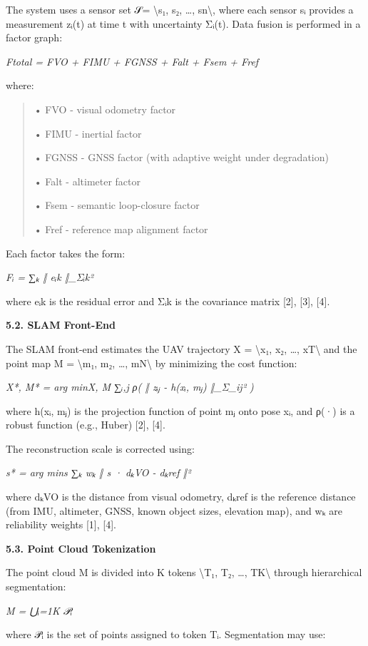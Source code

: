 \documentclass[
]{article}
\begin{document}
The system uses a sensor set 𝒮= \textbackslash s₁, s₂, \ldots,
sn\textbackslash, where each sensor sᵢ provides a measurement zᵢ(t) at
time t with uncertainty Σᵢ(t). Data fusion is performed in a factor
graph:

\emph{Ftotal = FVO + FIMU + FGNSS + Falt + Fsem + Fref}

where:

\begin{quote}
• FVO - visual odometry factor

• FIMU - inertial factor

• FGNSS - GNSS factor (with adaptive weight under degradation)

• Falt - altimeter factor

• Fsem - semantic loop-closure factor

• Fref - reference map alignment factor
\end{quote}

Each factor takes the form:

\emph{Fᵢ = ∑ₖ ‖ eᵢk ‖\_Σᵢk²}

where eᵢk is the residual error and Σᵢk is the covariance matrix
{[}2{]}, {[}3{]}, {[}4{]}.

\textbf{5.2. SLAM Front-End}

The SLAM front-end estimates the UAV trajectory X = \textbackslash x₁,
x₂, \ldots, xT\textbackslash{} and the point map M = \textbackslash m₁,
m₂, \ldots, mN\textbackslash{} by minimizing the cost function:

\emph{X*, M* = arg minX, M ∑ᵢ,j ρ( ‖ zᵢⱼ - h(xᵢ, mⱼ) ‖\_Σ\_ij² )}

where h(xᵢ, mⱼ) is the projection function of point mⱼ onto pose xᵢ, and
ρ(·) is a robust function (e.g., Huber) {[}2{]}, {[}4{]}.

The reconstruction scale is corrected using:

\emph{s* = arg mins ∑ₖ wₖ ‖ s · dₖVO - dₖref ‖²}

where dₖVO is the distance from visual odometry, dₖref is the reference
distance (from IMU, altimeter, GNSS, known object sizes, elevation map),
and wₖ are reliability weights {[}1{]}, {[}4{]}.

\textbf{5.3. Point Cloud Tokenization}

The point cloud M is divided into K tokens \textbackslash T₁, T₂,
\ldots, TK\textbackslash{} through hierarchical segmentation:

\emph{M = ⋃ᵢ=1K 𝒫ᵢ}

where 𝒫ᵢ is the set of points assigned to token Tᵢ. Segmentation may
use:
\end{document}
